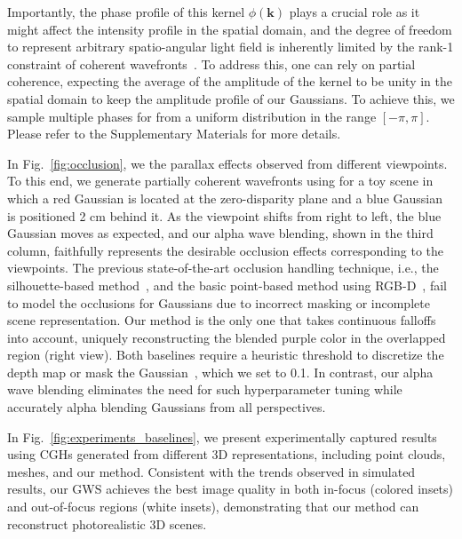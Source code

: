 Importantly, the phase profile of this kernel $\phi (\mathbf{k})$ plays a crucial role as it might affect the intensity profile in the spatial domain, and the degree of freedom to represent arbitrary spatio-angular light field is inherently limited by the rank-1 constraint of coherent wavefronts~\cite{zhang2011analysis}. To address this, one can rely on partial coherence, expecting the average of the amplitude of the kernel to be unity in the spatial domain to keep the amplitude profile of our Gaussians. To achieve this, we sample multiple phases for  from a uniform distribution in the range $[-\pi, \pi]$. Please refer to the Supplementary Materials for more details.

In Fig.~\ref{fig:occlusion}, we  the parallax effects observed from different viewpoints. To this end, we generate partially coherent wavefronts using  for a toy scene\revision{,} in which a red Gaussian is located at the zero-disparity plane and a blue Gaussian is positioned 2 cm behind it. As the viewpoint shifts from right to left, the blue Gaussian moves as expected, and our alpha wave blending, shown in the third column, faithfully represents the desirable occlusion effects corresponding to the viewpoints. The previous state-of-the-art occlusion handling technique, i.e., the silhouette-based method~\cite{matsushima2014silhouette}, and the basic point-based method using RGB-D~\cite{shi2021towards}, fail to model the occlusions for Gaussians due to incorrect masking or incomplete scene representation. Our method is the only one that takes continuous falloffs into account, uniquely reconstructing the blended purple color in the overlapped region (right view). Both baselines require a heuristic threshold to discretize the depth map or mask the Gaussian~\cite{chen2009computer}, which we set to 0.1. In contrast, our alpha wave blending eliminates the need for such hyperparameter tuning while accurately alpha blending Gaussians from all perspectives. 

\iffalse
{}


In Fig.~\ref{fig:experiments_baselines}, we present experimentally captured results using CGHs generated from different 3D representations, including point clouds, meshes, and our method. Consistent with the trends observed in simulated results, our GWS achieves the best image quality in both in-focus (colored insets) and out-of-focus regions (white insets), demonstrating that our method can reconstruct photorealistic 3D scenes. 

